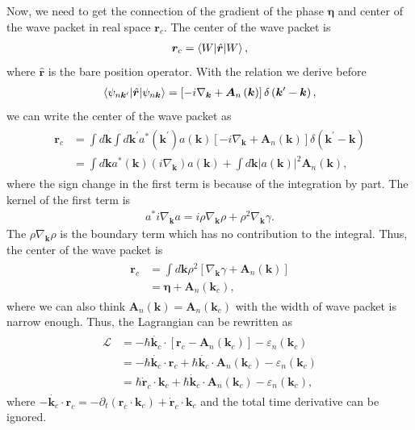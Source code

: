 \documentclass[12pt, oneside]{article}
\newcommand{\pr}{\prime}
\newcommand{\pa}{\partial}
\newcommand{\p}[1]{\left(#1\right)}
\newcommand{\bb}[1]{\left[#1\right]}
\newcommand{\bv}[1]{\left|#1\right|}
\numberwithin{equation}{subsection}
\begin{document}
Now, we need to get the connection of the gradient of the phase \(\bm{\eta}\) and center of the wave packet in real space \(\bm{r}_c\). The center of the wave packet is
\begin{align}
	\bm{r}_{c} = \braket{W|\hat{\bm{r}} |W},
\end{align}
where \(\hat{\bm{r}}\) is the bare position operator. With the relation we derive before
\begin{align}
	\braket{\psi_{n \bm{k}^\pr} | \hat{\bm{r}} | \psi_{n \bm{k}}} = \bb{-i \nabla_{\bm{k}}  + \bm{A}_{n} \p{\bm{k}} } \delta \p{\bm{k}^\pr - \bm{k}},
\end{align}
we can write the center of the wave packet as
\begin{align}
	\begin{split}
		\bm{r}_c & = \int d \bm{k} \int d \bm{k}^\pr a^{*} \p{\bm{k}^\pr} a \p{\bm{k}} \bb{-i \nabla_{\bm{k}}  + \bm{A}_{n} \p{\bm{k}} } \delta \p{\bm{k}^\pr - \bm{k}} \\
		& = \int d \bm{k} a^{*} \p{\bm{k}} \p{i \nabla_{\bm{k}} } a \p{\bm{k}} + \int d \bm{k} \bv{a \p{\bm{k}}}^2 \bm{A}_{n} \p{\bm{k}},
	\end{split}
\end{align}
where the sign change in the first term is because of the integration by part. The kernel of the first term is
\begin{align}
	a^* i \nabla_{\bm{k}} a = i \rho \nabla_{\bm{k}} \rho + \rho^2 \nabla_{\bm{k}} \gamma.
\end{align}
The \(\rho \nabla_{\bm{k}} \rho\) is the boundary term which has no contribution to the integral. Thus, the center of the wave packet is
\begin{align}
	\begin{split}
		\bm{r}_c & = \int d \bm{k} \rho^2 \bb{\nabla_{\bm{k}} \gamma + \bm{A}_{n} \p{\bm{k}}} \\
		& = \bm{\eta} + \bm{A}_{n} \p{\bm{k}_c},
	\end{split}
\end{align}
where we can also think \(\bm{A}_{n} \p{\bm{k}} = \bm{A}_{n} \p{\bm{k}_c}\) with the width of wave packet is narrow enough. Thus, the Lagrangian can be rewritten as
\begin{align}
	\begin{split}
		\mathcal{L} & = - \hbar \dot{\bm{k}_c} \cdot \bb{\bm{r}_c - \bm{A}_{n} \p{\bm{k}_c}} - \varepsilon_n \p{\bm{k}_c} \\
		& = - \hbar \dot{\bm{k}_c} \cdot \bm{r}_c + \hbar \dot{\bm{k}_c} \cdot \bm{A}_{n} \p{\bm{k}_c} - \varepsilon_n \p{\bm{k}_c} \\
		& = \hbar \dot{\bm{r}}_c \cdot \bm{k}_c + \hbar \dot{\bm{k}}_c \cdot \bm{A}_{n} \p{\bm{k}_c} - \varepsilon_n \p{\bm{k}_c},
	\end{split}
\end{align}
where \( -  \dot{\bm{k}_c} \cdot \bm{r}_c = - \pa_{t} \p{\bm{r}_c \cdot \bm{k}_c} + \dot{\bm{r}}_c \cdot \bm{k}_c\) and the total time derivative can be ignored.
\end{document}

